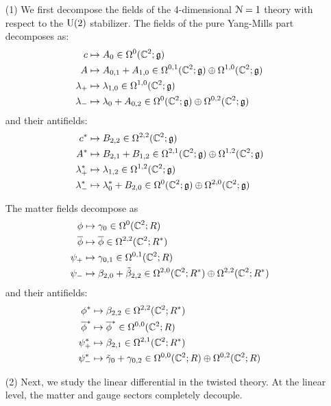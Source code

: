 \documentclass[10pt, oneside]{article}
\begin{document}
\begin{itemize}
\item[(1)] 
We first decompose the fields of the 4-dimensional $\mathcal{N}=1$ theory with respect to the ${\rm U}(2)$ stabilizer.
The fields of the pure Yang-Mills part decomposes as:
\begin{align*}
c & \mapsto A_{0} \in \Omega^0(\mathbb C^2 ; \mathfrak g) \\
A & \mapsto A_{0,1} + A_{1,0} \in \Omega^{0,1}(\mathbb C^2 ; \mathfrak g) \oplus \Omega^{1,0}(\mathbb C^2 ; \mathfrak g) \\
\lambda_+ & \mapsto \lambda_{1,0} \in \Omega^{1,0}(\mathbb C^2 ; \mathfrak g) \\
\lambda_- & \mapsto \lambda_0 + A_{0,2} \in \Omega^{0}(\mathbb C^2 ; \mathfrak g) \oplus \Omega^{0,2}(\mathbb C^2 ; \mathfrak g) 
\end{align*}
and their antifields:
\begin{align*}
c^* & \mapsto B_{2,2} \in \Omega^{2,2}(\mathbb C^2 ; \mathfrak g) \\
A^* & \mapsto B_{2,1} + B_{1,2} \in \Omega^{2,1}(\mathbb C^2;\mathfrak g) \oplus \Omega^{1,2}(\mathbb C^2; \mathfrak g) \\
\lambda^*_+ & \mapsto \lambda_{1,2} \in \Omega^{1,2}(\mathbb C^2 ; \mathfrak g) \\
\lambda^*_- & \mapsto \lambda_0^*+ B_{2,0} \in \Omega^{0}(\mathbb C^2 ; \mathfrak g) \oplus \Omega^{2,0}(\mathbb C^2 ; \mathfrak g) 
\end{align*}

The matter fields decompose as
\begin{align*}
\phi & \mapsto \gamma_0 \in \Omega^0 (\mathbb C^2 ; R) \\
\overline{\phi} & \mapsto \overline{\phi} \in \Omega^{2,2}(\mathbb C^2 ; R^*) \\
\psi_+ & \mapsto \gamma_{0,1} \in \Omega^{0,1}(\mathbb C^2 ; R) \\
\psi_- & \mapsto \beta_{2,0} + \Tilde{\beta}_{2,2} \in \Omega^{2,0}(\mathbb C^2 ; R^*) \oplus \Omega^{2,2}(\mathbb C^2 ; R^*) 
\end{align*}
and their antifields:
\begin{align*}
\phi^* & \mapsto \beta_{2,2} \in \Omega^{2,2} (\mathbb C^2 ; R^*) \\
\overline{\phi}^* & \mapsto \overline{\phi}^* \in \Omega^{0,0}(\mathbb C^2 ; R) \\
\psi^*_+ & \mapsto \beta_{2,1} \in \Omega^{2,1}(\mathbb C^2 ; R^*) \\
\psi^*_- & \mapsto \Tilde{\gamma}_0 + \gamma_{0,2} \in \Omega^{0,0}(\mathbb C^2 ; R) \oplus \Omega^{0,2}(\mathbb C^2 ; R) 
\end{align*}

\item[(2)] Next, we study the linear differential in the twisted theory. 
At the linear level, the matter and gauge sectors completely decouple. 


\end{itemize}
\end{document}
